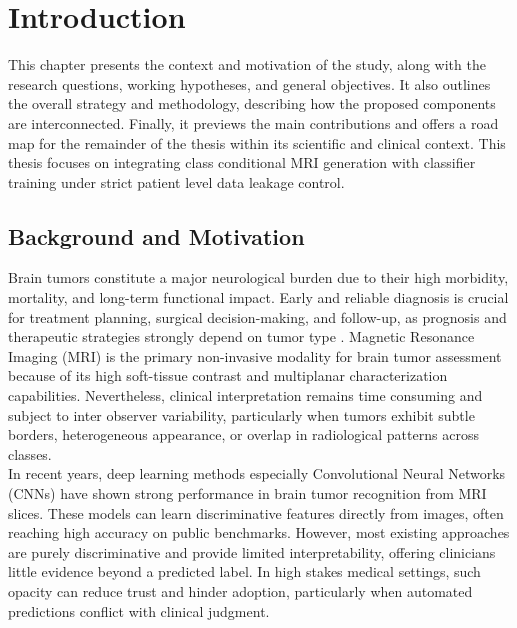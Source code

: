 \chapter{Introduction}

This chapter presents the context and motivation of the study, along with the research questions, working hypotheses, and general objectives. It also outlines the overall strategy and methodology, describing how the proposed components are interconnected. Finally, it previews the main contributions and offers a road map for the remainder of the thesis within its scientific and clinical context. This thesis focuses on integrating class conditional MRI generation with classifier training under strict patient level data leakage control.

\section{Background and Motivation}

Brain tumors constitute a major neurological burden due to their high morbidity, mortality, and long-term functional impact. Early and reliable diagnosis is crucial for treatment planning, surgical decision-making, and follow-up, as prognosis and therapeutic strategies strongly depend on tumor type \cite{Vadhavekar2024AdvancementsImagingNeurosurgical}. Magnetic Resonance Imaging (MRI) is the primary non-invasive modality for brain tumor assessment because of its high soft-tissue contrast and multiplanar characterization capabilities. Nevertheless, clinical interpretation remains time consuming and subject to inter observer variability, particularly when tumors exhibit subtle borders, heterogeneous appearance, or overlap in radiological patterns across classes.\\

In recent years, deep learning methods especially Convolutional Neural Networks (CNNs) \cite{hayat2024cnnsvm} have shown strong performance in brain tumor recognition from MRI slices. These models can learn discriminative features directly from images, often reaching high accuracy on public benchmarks. However, most existing approaches are purely discriminative and provide limited interpretability, offering clinicians little evidence beyond a predicted label. In high stakes medical settings, such opacity can reduce trust and hinder adoption, particularly when automated predictions conflict with clinical judgment.\\

